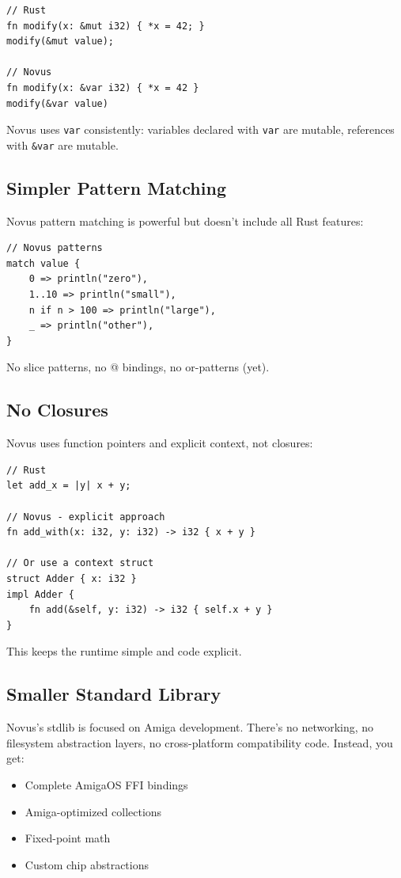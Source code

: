 \begin{lstlisting}
// Rust
fn modify(x: &mut i32) { *x = 42; }
modify(&mut value);

// Novus
fn modify(x: &var i32) { *x = 42 }
modify(&var value)
\end{lstlisting}

Novus uses \texttt{var} consistently: variables declared with \texttt{var} are mutable, references with \texttt{\&var} are mutable.

\subsection{Simpler Pattern Matching}

Novus pattern matching is powerful but doesn't include all Rust features:

\begin{lstlisting}
// Novus patterns
match value {
    0 => println("zero"),
    1..10 => println("small"),
    n if n > 100 => println("large"),
    _ => println("other"),
}
\end{lstlisting}

No slice patterns, no @ bindings, no or-patterns (yet).

\subsection{No Closures}

Novus uses function pointers and explicit context, not closures:

\begin{lstlisting}
// Rust
let add_x = |y| x + y;

// Novus - explicit approach
fn add_with(x: i32, y: i32) -> i32 { x + y }

// Or use a context struct
struct Adder { x: i32 }
impl Adder {
    fn add(&self, y: i32) -> i32 { self.x + y }
}
\end{lstlisting}

This keeps the runtime simple and code explicit.

\subsection{Smaller Standard Library}

Novus's stdlib is focused on Amiga development. There's no networking, no filesystem abstraction layers, no cross-platform compatibility code. Instead, you get:

\begin{itemize}
    \item Complete AmigaOS FFI bindings
    \item Amiga-optimized collections
    \item Fixed-point math
    \item Custom chip abstractions
\end{itemize}

